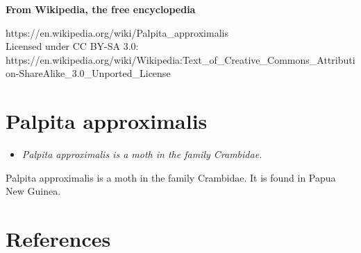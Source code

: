 \textbf{From Wikipedia, the free encyclopedia}

https://en.wikipedia.org/wiki/Palpita\_approximalis\\
Licensed under CC BY-SA 3.0:\\
https://en.wikipedia.org/wiki/Wikipedia:Text\_of\_Creative\_Commons\_Attribution-ShareAlike\_3.0\_Unported\_License

\section{Palpita approximalis}\label{palpita-approximalis}

\begin{itemize}
\item
  \emph{Palpita approximalis is a moth in the family Crambidae.}
\end{itemize}

Palpita approximalis is a moth in the family Crambidae. It is found in
Papua New Guinea.

\section{References}\label{references}
